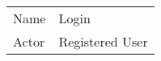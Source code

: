 \begin{table}[]
\begin{tabular}{ll}
Name             & Login                                                                                                                                                                                                                                                                                                                                                                                                                                                                                                                                                                                                                                                                                                                                                                                                                                                                                                                                                                                                                               \\
Actor            & Registered User                                                                                                                                                                                                                                                                                                                                                                                                                                                                                                                                                                                                                                                                                                                                                                                                                                                                                                                                                                                                                                \\

\end{tabular}
\end{table}
